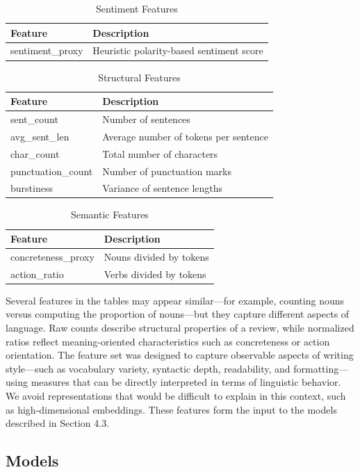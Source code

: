 \documentclass[12pt]{article}
\begin{document}
\begin{longtable}{ll}
\caption{Sentiment Features} \\
\textbf{Feature} & \textbf{Description} \\
\hline
sentiment\_proxy & Heuristic polarity-based sentiment score \\
\end{longtable}

\begin{longtable}{ll}
\caption{Structural Features} \\
\textbf{Feature} & \textbf{Description} \\
\hline
sent\_count & Number of sentences \\
avg\_sent\_len & Average number of tokens per sentence \\
char\_count & Total number of characters \\
punctuation\_count & Number of punctuation marks \\
burstiness & Variance of sentence lengths \\
\end{longtable}

\begin{longtable}{ll}
\caption{Semantic Features} \\
\textbf{Feature} & \textbf{Description} \\
\hline
concreteness\_proxy & Nouns divided by tokens \\
action\_ratio & Verbs divided by tokens \\
\end{longtable}

Several features in the tables may appear similar—for example, counting nouns versus computing the proportion of nouns—but they capture different aspects of language. Raw counts describe structural properties of a review, while normalized ratios reflect meaning-oriented characteristics such as concreteness or action orientation. The feature set was designed to capture observable aspects of writing style—such as vocabulary variety, syntactic depth, readability, and formatting—using measures that can be directly interpreted in terms of linguistic behavior. We avoid representations that would be difficult to explain in this context, such as high-dimensional embeddings. These features form the input to the models described in Section 4.3.

\subsection{Models}
\end{document}
